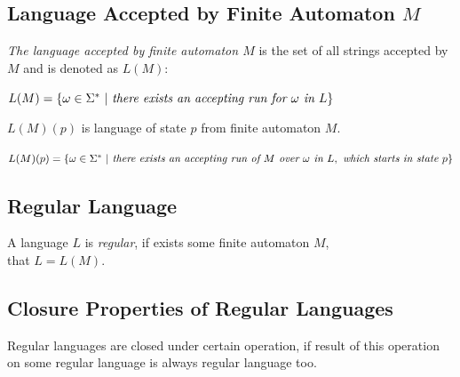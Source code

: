 		\subsection{Language Accepted by Finite Automaton $M$}
		\label{defLangM}
		\begin{definition}
			\emph{The language accepted by finite automaton $M$} is the set of all strings accepted by $M$ and is denoted as $L(M)$:
			\begin{description}
				\item $L(M) = \{\omega\in\Sigma^{*}\ |\ \emph{there exists an accepting run for }\omega\emph{ in }L\}$
			\end{description}
		\end{definition}
		\begin{definition}
			$L(M)(p)$ is language of state $p$ from finite automaton $M$.
			\begin{description}
				\item $L(M)(p) = \{\omega\in\Sigma^{*}\ |\ \emph{there exists an accepting run of }M\emph{ over }\omega\emph{ in }L,\emph{ which starts in state }p\}$
			\end{description}
		\end{definition}
		\subsection{Regular Language}
		\begin{definition}
			A language $L$ is \emph{regular}, if exists some finite automaton $M$,\\ that $L=L(M)$.
		\end{definition}

		\subsection{Closure Properties of Regular Languages}
		\label{defClose}
		Regular languages are closed under certain operation, if result of this operation on some regular language is always regular language too.

